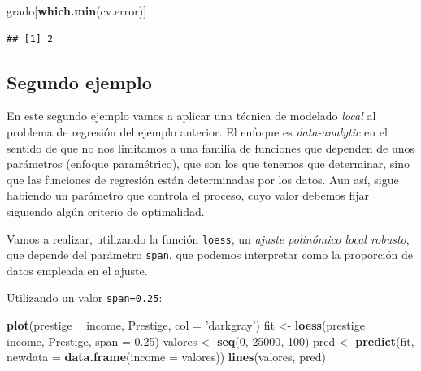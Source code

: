 \documentclass[]{book}
\newenvironment{Shaded}{\begin{snugshade}}{\end{snugshade}}
\newcommand{\KeywordTok}[1]{\textcolor[rgb]{0.13,0.29,0.53}{\textbf{#1}}}
\newcommand{\DataTypeTok}[1]{\textcolor[rgb]{0.13,0.29,0.53}{#1}}
\newcommand{\DecValTok}[1]{\textcolor[rgb]{0.00,0.00,0.81}{#1}}
\newcommand{\FloatTok}[1]{\textcolor[rgb]{0.00,0.00,0.81}{#1}}
\newcommand{\StringTok}[1]{\textcolor[rgb]{0.31,0.60,0.02}{#1}}
\newcommand{\OperatorTok}[1]{\textcolor[rgb]{0.81,0.36,0.00}{\textbf{#1}}}
\newcommand{\NormalTok}[1]{#1}
\begin{document}
\begin{Shaded}
\begin{Highlighting}[]
\NormalTok{grado[}\KeywordTok{which.min}\NormalTok{(cv.error)]}
\end{Highlighting}
\end{Shaded}

\begin{verbatim}
## [1] 2
\end{verbatim}

\subsection{Segundo ejemplo}\label{segundo-ejemplo}

En este segundo ejemplo vamos a aplicar una técnica de modelado
\emph{local} al problema de regresión del ejemplo anterior. El enfoque
es \emph{data-analytic} en el sentido de que no nos limitamos a una
familia de funciones que dependen de unos parámetros (enfoque
paramétrico), que son los que tenemos que determinar, sino que las
funciones de regresión están determinadas por los datos. Aun así, sigue
habiendo un parámetro que controla el proceso, cuyo valor debemos fijar
siguiendo algún criterio de optimalidad.

Vamos a realizar, utilizando la función \texttt{loess}, un \emph{ajuste
polinómico local robusto}, que depende del parámetro \texttt{span}, que
podemos interpretar como la proporción de datos empleada en el ajuste.

Utilizando un valor \texttt{span=0.25}:

\begin{Shaded}
\begin{Highlighting}[]
\KeywordTok{plot}\NormalTok{(prestige }\OperatorTok{~}\StringTok{ }\NormalTok{income, Prestige, }\DataTypeTok{col =} \StringTok{'darkgray'}\NormalTok{)}
\NormalTok{fit <-}\StringTok{ }\KeywordTok{loess}\NormalTok{(prestige }\OperatorTok{~}\StringTok{ }\NormalTok{income, Prestige, }\DataTypeTok{span =} \FloatTok{0.25}\NormalTok{)}
\NormalTok{valores <-}\StringTok{ }\KeywordTok{seq}\NormalTok{(}\DecValTok{0}\NormalTok{, }\DecValTok{25000}\NormalTok{, }\DecValTok{100}\NormalTok{)}
\NormalTok{pred <-}\StringTok{ }\KeywordTok{predict}\NormalTok{(fit, }\DataTypeTok{newdata =} \KeywordTok{data.frame}\NormalTok{(}\DataTypeTok{income =}\NormalTok{ valores))}
\KeywordTok{lines}\NormalTok{(valores, pred)}
\end{Highlighting}
\end{Shaded}
\end{document}
